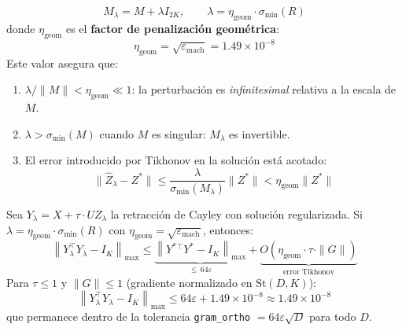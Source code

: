 \begin{equation}
  M_\lambda = M + \lambda I_{2K}, \qquad
  \lambda = \eta_{\text{geom}} \cdot \sigma_{\min}(R)
  \label{eq:tikhonov}
\end{equation}
donde $\eta_{\text{geom}}$ es el \textbf{factor de penalización geométrica}:
\begin{equation}
  \eta_{\text{geom}} = \sqrt{\varepsilon_{\text{mach}}} = 1.49 \times 10^{-8}
\end{equation}
Este valor asegura que:
\begin{enumerate}
  \item $\lambda / \|M\| < \eta_{\text{geom}} \ll 1$: la perturbación es \textit{infinitesimal}
        relativa a la escala de $M$.
  \item $\lambda > \sigma_{\min}(M)$ cuando $M$ es singular: $M_\lambda$ es invertible.
  \item El error introducido por Tikhonov en la solución está acotado:
        \begin{equation}
          \|\hat{Z}_\lambda - Z^*\| \le \frac{\lambda}{\sigma_{\min}(M_\lambda)} \|Z^*\| < \eta_{\text{geom}} \|Z^*\|
        \end{equation}
\end{enumerate}

\begin{theorem}
Sea $Y_\lambda = X + \tau \cdot U Z_\lambda$ la retracción de Cayley con solución regularizada.
Si $\lambda = \eta_{\text{geom}} \cdot \sigma_{\min}(R)$ con $\eta_{\text{geom}} = \sqrt{\varepsilon_{\text{mach}}}$,
entonces:
\begin{equation}
  \left\| Y_\lambda^\top Y_\lambda - I_K \right\|_{\max} \le
  \underbrace{\left\| Y^*{}^\top Y^* - I_K \right\|_{\max}}_{\le\, 64\varepsilon}
  + \underbrace{O(\eta_{\text{geom}} \cdot \tau \cdot \|G\|)}_{\text{error Tikhonov}}
\end{equation}
Para $\tau \le 1$ y $\|G\| \le 1$ (gradiente normalizado en $\mathrm{St}(D,K)$):
\begin{equation}
  \left\| Y_\lambda^\top Y_\lambda - I_K \right\|_{\max}
  \le 64\varepsilon + 1.49 \times 10^{-8} \approx 1.49 \times 10^{-8}
\end{equation}
que permanece dentro de la tolerancia \texttt{gram\_ortho} $= 64\varepsilon\sqrt{D}$ para todo $D$.
\end{theorem}

